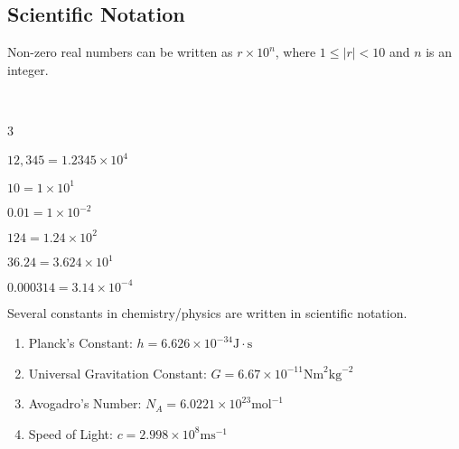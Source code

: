 \documentclass[crop=false,class=article,oneside]{standalone}
\begin{document}
    \subsection{Scientific Notation}
        Non-zero real numbers can be written as
        ${r}\times{10^{n}}$, where ${1}\leq{|r|}<10$
        and $n$ is an integer.
        \begin{example}
            \
            \begin{enumerate}
            \end{enumerate}
        \end{example}
        \begin{remark}
            Several constants in chemistry/physics are
            written in scientific notation.
            \begin{enumerate}
                \item Planck's Constant:
                    $h={6.626}\times{10^{-34}}%
                    \textrm{J}\cdot\textrm{s}$
                \item Universal Gravitation Constant:
                    $G={6.67}\times{10^{-11}}%
                    \textrm{Nm}^{2}\textrm{kg}^{-2}$
                \item Avogadro's Number:
                    $N_{A}={6.0221}\times{10^{23}}%
                    \textrm{mol}^{-1}$
                \item Speed of Light:
                    $c={2.998}\times{10^{8}\textrm{ms}^{-1}}$
            \end{enumerate}
        \end{remark}
\end{document}
